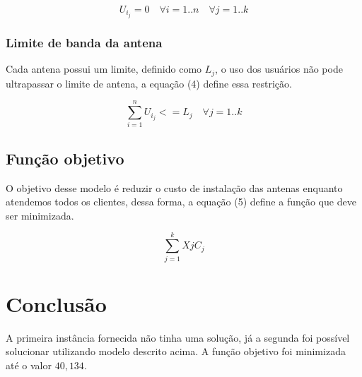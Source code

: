 \documentclass{article}
\begin{document}
    \begin{equation}
        U_i_j = 0 \quad
        \forall i=1..n \quad
        \forall j=1..k
    \end{equation}

    \subsubsection{Limite de banda da antena}
    Cada antena possui um limite, definido como $L_j$, o uso dos usuários não pode ultrapassar o limite de antena,
    a equação (4) define essa restrição.

    \begin{equation}
        \sum_{i=1}^{n} U_i_j <= L_j \quad
        \forall j=1..k
    \end{equation}

    \subsection{Função objetivo}
    O objetivo desse modelo é reduzir o custo de instalação das antenas enquanto atendemos
    todos os clientes, dessa forma, a equação (5) define a função que deve ser minimizada.

    \begin{equation}
        \sum_{j=1}^{k} Xj C_j
    \end{equation}

    \section{Conclusão}
    A primeira instância fornecida não tinha uma solução, já a segunda foi possível solucionar utilizando modelo descrito acima.
    A função objetivo foi minimizada até o valor $40,134$.
\end{document}
